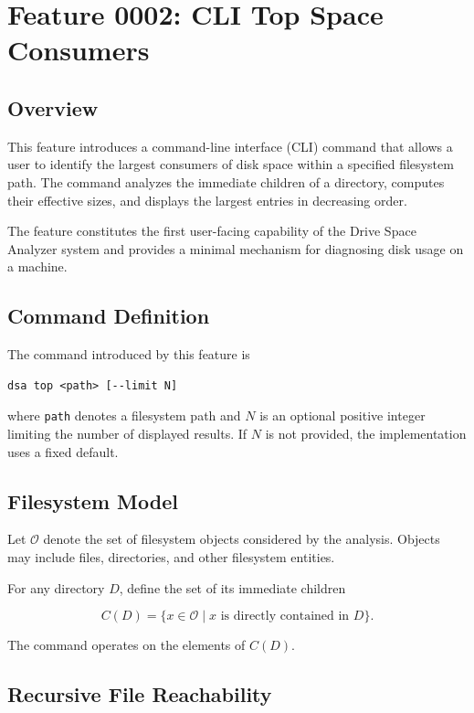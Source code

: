 \section{Feature 0002: CLI Top Space Consumers}

\subsection{Overview}

This feature introduces a command-line interface (CLI) command that allows a user to identify the largest consumers of disk space within a specified filesystem path. The command analyzes the immediate children of a directory, computes their effective sizes, and displays the largest entries in decreasing order.

The feature constitutes the first user-facing capability of the Drive Space Analyzer system and provides a minimal mechanism for diagnosing disk usage on a machine.

\subsection{Command Definition}

The command introduced by this feature is

\begin{verbatim}
dsa top <path> [--limit N]
\end{verbatim}

where \texttt{path} denotes a filesystem path and \(N\) is an optional positive integer limiting the number of displayed results. If \(N\) is not provided, the implementation uses a fixed default.

\subsection{Filesystem Model}

Let \(\mathcal{O}\) denote the set of filesystem objects considered by the analysis. Objects may include files, directories, and other filesystem entities.

For any directory \(D\), define the set of its immediate children

\[
C(D) = \{x \in \mathcal{O} \mid x \text{ is directly contained in } D\}.
\]

The command operates on the elements of \(C(D)\).

\subsection{Recursive File Reachability}

